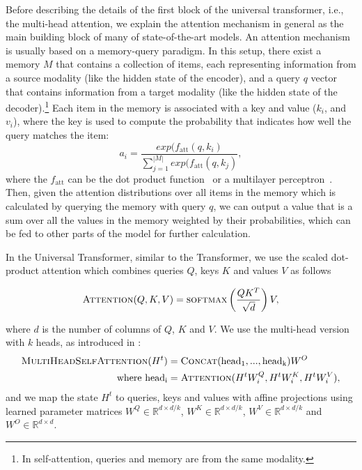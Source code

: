 Before describing the details of the first block of the universal transformer, i.e., the multi-head attention, we explain the attention mechanism in general as the main building block of many of state-of-the-art models.
An attention mechanism is usually based on a memory-query paradigm. In this setup, there exist a memory $M$ that contains a collection of items, each representing information from a source modality (like the hidden state of the encoder), and a query $q$ vector that contains information from a target modality (like the hidden state of the decoder).\footnote{In self-attention, queries and memory are from the same modality.}
Each item in the memory is associated with a key and value ($k_i$, and $v_i$), where the key is used to compute the probability that indicates how well the query matches the item:
\begin{equation}
a_i = \frac{exp(f_{\text{att}}(q, k_i)}{\sum_{j=1}^|M| exp(f_{\text{att}}(q, k_j)},
\end{equation}
where the $f_\text{att}$ can be the dot product function~\citep{luong2015effective} or a multilayer perceptron~\citep{bahdanau2014neural}. Then, given the attention distributions over all items in the memory which is calculated by querying the memory with query $q$, we can output a value that is a sum over all the values in the memory weighted by their probabilities, which can  be fed to other parts of the model for further calculation.

In the Universal Transformer, similar to the Transformer, we use the scaled dot-product attention which combines queries $Q$, keys $K$ and values $V$ as follows

\begin{equation}
   \textsc{Attention}(Q, K, V) = \textsc{softmax} \left( \frac{QK^T}{\sqrt{d}} \right) V,
\end{equation}

where $d$ is the number of columns of $Q$, $K$ and $V$. We use the multi-head version with $k$ heads, as introduced in \citep{transformer}:
\begin{align}
    \label{MultiheadSelfAttention}
    \textsc{MultiHeadSelfAttention}(H^t) &= \textsc{Concat}(\mathrm{head_1}, ..., \mathrm{head_k})W^O\\
    \text{where}~\mathrm{head_i} &= \textsc{Attention}(H^t W^Q_i, H^t W^K_i, H^t W^V_i),
\end{align}
and we map the state $H^t$ to queries, keys and values with affine projections using learned parameter matrices $W^Q \in \mathbb{R}^{d \times d/k}$, $W^K \in \mathbb{R}^{d \times d/k}$, $W^V \in \mathbb{R}^{d \times d/k}$ and $W^O \in \mathbb{R}^{d \times d}$.

